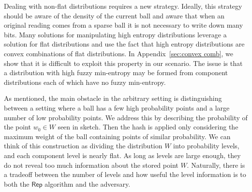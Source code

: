 \documentclass[11pt]{article}
\newcommand{\apref}[1]{\mbox{Appendix~\ref{#1}}}
\newcommand{\class}[1]{{\ensuremath{\mathsf{#1}}}}
\newcommand{\rep}{\ensuremath{\class{Rep}}\xspace}
\begin{document}
Dealing with non-flat distributions requires a new strategy.  Ideally, this strategy should be aware of the density of the current ball and aware that when an original reading comes from a sparse ball it is not necessary to write down many bits.  Many solutions for manipulating high entropy distributions leverage a solution for flat distributions and use the fact that high entropy distributions are convex combinations of flat distributions.  In \apref{sec:convex comb}, we show that it is difficult to exploit this property in our scenario.  The issue is that a distribution with high fuzzy min-entropy may be formed from component distributions each of which have no fuzzy min-entropy.

As mentioned, the main obstacle in the arbitrary setting is distinguishing between a setting where a ball has a few high probability points and a large number of low probability points.
We address this by describing the probability of the point $w_0\in W$ seen in sketch.  Then the hash is applied only considering the maximum weight of the ball containing points of similar probability.  We can think of this construction as dividing the distribution $W$ into probability levels, and each component level is nearly flat.  As long as levels are large enough, they do not reveal too much information about the stored point $W$.  Naturally, there is a tradeoff between the number of levels and how useful the level information is to both the \rep algorithm and the adversary.
\end{document}

